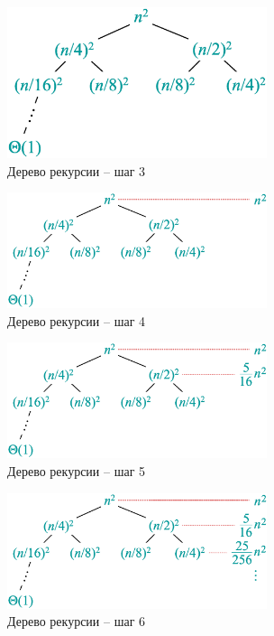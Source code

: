 \documentclass[a4paper,11pt]{article}
\begin{document}
\begin{figure}[p]
  \centering
  \includegraphics[width=3in]{lecture2/tree3.eps}
  \caption{Дерево рекурсии -- шаг 3}
  \label{fig:rectree3}
\end{figure}

\begin{figure}[p]
  \centering
  \includegraphics[width=3in]{lecture2/tree4.eps}
  \caption{Дерево рекурсии -- шаг 4}
  \label{fig:rectree4}
\end{figure}

\begin{figure}[p]
  \centering
  \includegraphics[width=3in]{lecture2/tree5.eps}
  \caption{Дерево рекурсии -- шаг 5}
  \label{fig:rectree5}
\end{figure}

\begin{figure}[p]
  \centering
  \includegraphics[width=3in]{lecture2/tree6.eps}
  \caption{Дерево рекурсии -- шаг 6}
  \label{fig:rectree6}
\end{figure}
\end{document}
